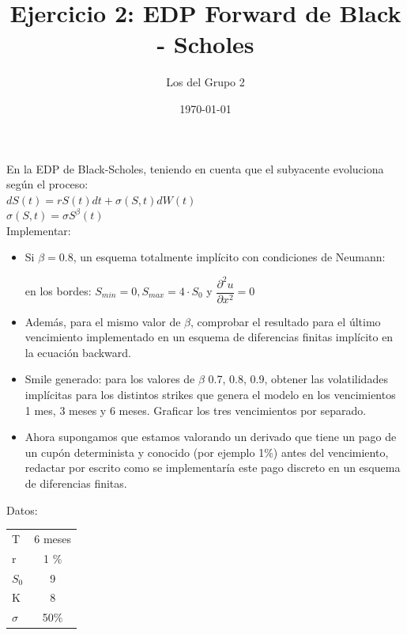 \documentclass[titlepage]{article}
\title{Ejercicio 2: EDP Forward de Black - Scholes}
\author{Los del Grupo 2}
\date{\today}
\begin{document}
\maketitle

En la EDP de Black-Scholes, teniendo en cuenta que el subyacente evoluciona según el proceso: \\

$dS(t) = rS(t)dt + \sigma(S,t)dW(t)$ \\

$\sigma(S,t) = \sigma S^{\beta}(t)$  \\

Implementar: \\

\begin{itemize}
	\item Si $\beta = 0.8$, un esquema totalmente implícito con condiciones de Neumann: \\
		\begin{center}
			en los bordes: $S_{min} = 0, S_{max} = 4 \cdot S_{0}$ y $\dfrac{\partial^{2}u}{\partial{x}^{2}} = 0$
		\end{center}
		
	\item Además, para el mismo valor de $\beta$, comprobar el resultado para el último vencimiento implementado en un esquema de diferencias finitas implícito en la ecuación backward.
	
	\item Smile generado: para los valores de $\beta$ 0.7, 0.8, 0.9, obtener las volatilidades implícitas para los distintos strikes que genera el modelo en los vencimientos 1 mes, 3 meses y 6 meses. Graficar los tres vencimientos por separado.
	
	\item Ahora supongamos que estamos valorando un derivado que tiene un pago de un cupón determinista y conocido (por ejemplo 1$\%$) antes del vencimiento, redactar por escrito como se implementaría este pago discreto en un esquema de diferencias finitas.	
\end{itemize}

Datos: \\

\begin{tabular}{| l | c |}
	\hline
		T & 6 meses \\
		r & 1 $\%$ \\
		$S_{0}$ & 9 \\
		K & 8 \\
		$\sigma$ & 50$\%$\\
	\hline	
\end{tabular}
\end{document}
